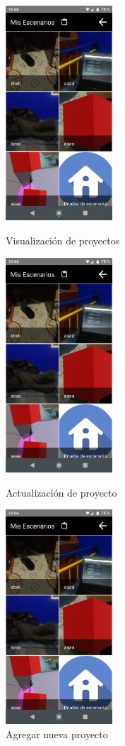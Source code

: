 \begin{figure}[h!]
	\begin{minipage}{0.32\textwidth}
		\centering
		\includegraphics[width=4cm,height=8cm]{imagenes/desarrollo/app/scenarios.png}
		\caption{Visualización de proyectos}
		\label{fig:rec02}
	\end{minipage}\hfill
	\begin{minipage}{0.32\textwidth}
		\centering
		\includegraphics[width=4cm,height=8cm]{imagenes/desarrollo/app/scenarios.png}
		\caption{Actualización de proyecto}
		\label{fig:rec01}
	\end{minipage}\hfill
	\begin{minipage}{0.32\textwidth}
		\centering
		\includegraphics[width=4cm,height=8cm]{imagenes/desarrollo/app/scenarios.png}
		\caption{Agregar nueva proyecto}
		\label{fig:rec03}
	\end{minipage}\hfill
\end{figure}

\clearpage
